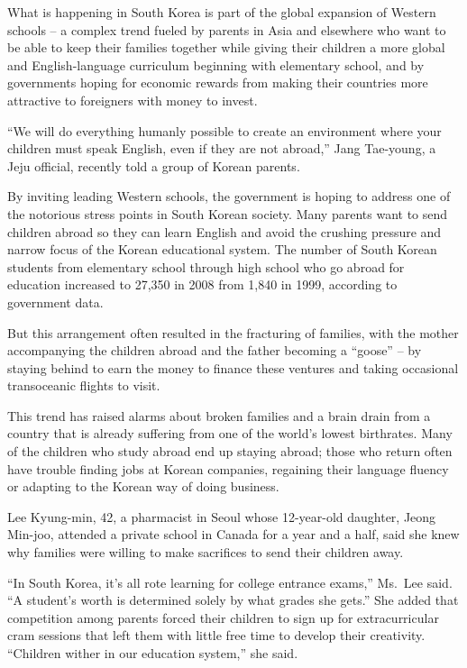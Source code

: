 ﻿\documentclass[12pt]{article}
\begin{document}
What is happening in South Korea is part of the global expansion of Western schools -- a complex
trend fueled by parents in Asia and elsewhere who want to be able to keep their families together
while giving their children a more global and English-language curriculum beginning with elementary
school, and by governments hoping for economic rewards from making their countries more attractive
to foreigners with money to invest.

``We will do everything humanly possible to create an environment where your children must speak
English, even if they are not abroad,'' Jang Tae-young, a Jeju official, recently told a group of
Korean parents.

By inviting leading Western schools, the government is hoping to address one of the notorious stress
points in South Korean society. Many parents want to send children abroad so they can learn English
and avoid the crushing pressure and narrow focus of the Korean educational system. The number of
South Korean students from elementary school through high school who go abroad for education
increased to 27,350 in 2008 from 1,840 in 1999, according to government data.

But this arrangement often resulted in the fracturing of families, with the mother accompanying the
children abroad and the father becoming a ``goose'' -- by staying behind to earn the money to
finance these ventures and taking occasional transoceanic flights to visit.

This trend has raised alarms about broken families and a brain drain from a country that is already
suffering from one of the world's lowest birthrates. Many of the children who study abroad end up
staying abroad; those who return often have trouble finding jobs at Korean companies, regaining
their language fluency or adapting to the Korean way of doing business.

Lee Kyung-min, 42, a pharmacist in Seoul whose 12-year-old daughter, Jeong Min-joo, attended a
private school in Canada for a year and a half, said she knew why families were willing to make
sacrifices to send their children away.

``In South Korea, it's all rote learning for college entrance exams,'' Ms.~Lee said. ``A student's
worth is determined solely by what grades she gets.'' She added that competition among parents
forced their children to sign up for extracurricular cram sessions that left them with little free
time to develop their creativity. ``Children wither in our education system,'' she said.
\end{document}
